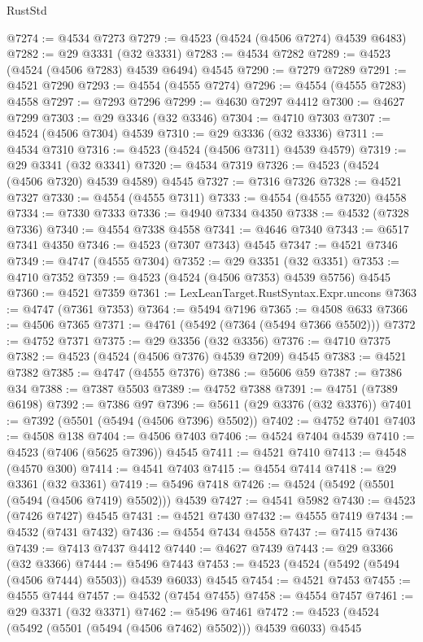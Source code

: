 \begin{lexlean}{RustStd}
\begin{coremodule}
@7274 := @4534 @7273
@7279 := @4523 (@4524 (@4506 @7274) @4539 @6483)
@7282 := @29 @3331 (@32 @3331)
@7283 := @4534 @7282
@7289 := @4523 (@4524 (@4506 @7283) @4539 @6494) @4545
@7290 := @7279 @7289
@7291 := @4521 @7290
@7293 := @4554 (@4555 @7274)
@7296 := @4554 (@4555 @7283) @4558
@7297 := @7293 @7296
@7299 := @4630 @7297 @4412
@7300 := @4627 @7299
@7303 := @29 @3346 (@32 @3346)
@7304 := @4710 @7303
@7307 := @4524 (@4506 @7304) @4539
@7310 := @29 @3336 (@32 @3336)
@7311 := @4534 @7310
@7316 := @4523 (@4524 (@4506 @7311) @4539 @4579)
@7319 := @29 @3341 (@32 @3341)
@7320 := @4534 @7319
@7326 := @4523 (@4524 (@4506 @7320) @4539 @4589) @4545
@7327 := @7316 @7326
@7328 := @4521 @7327
@7330 := @4554 (@4555 @7311)
@7333 := @4554 (@4555 @7320) @4558
@7334 := @7330 @7333
@7336 := @4940 @7334 @4350
@7338 := @4532 (@7328 @7336)
@7340 := @4554 @7338 @4558
@7341 := @4646 @7340
@7343 := @6517 @7341 @4350
@7346 := @4523 (@7307 @7343) @4545
@7347 := @4521 @7346
@7349 := @4747 (@4555 @7304)
@7352 := @29 @3351 (@32 @3351)
@7353 := @4710 @7352
@7359 := @4523 (@4524 (@4506 @7353) @4539 @5756) @4545
@7360 := @4521 @7359
@7361 := LexLeanTarget.RustSyntax.Expr.uncons
@7363 := @4747 (@7361 @7353)
@7364 := @5494 @7196
@7365 := @4508 @633
@7366 := @4506 @7365
@7371 := @4761 (@5492 (@7364 (@5494 @7366 @5502)))
@7372 := @4752 @7371
@7375 := @29 @3356 (@32 @3356)
@7376 := @4710 @7375
@7382 := @4523 (@4524 (@4506 @7376) @4539 @7209) @4545
@7383 := @4521 @7382
@7385 := @4747 (@4555 @7376)
@7386 := @5606 @59
@7387 := @7386 @34
@7388 := @7387 @5503
@7389 := @4752 @7388
@7391 := @4751 (@7389 @6198)
@7392 := @7386 @97
@7396 := @5611 (@29 @3376 (@32 @3376))
@7401 := @7392 (@5501 (@5494 (@4506 @7396) @5502))
@7402 := @4752 @7401
@7403 := @4508 @138
@7404 := @4506 @7403
@7406 := @4524 @7404 @4539
@7410 := @4523 (@7406 (@5625 @7396)) @4545
@7411 := @4521 @7410
@7413 := @4548 (@4570 @300)
@7414 := @4541 @7403
@7415 := @4554 @7414
@7418 := @29 @3361 (@32 @3361)
@7419 := @5496 @7418
@7426 := @4524 (@5492 (@5501 (@5494 (@4506 @7419) @5502))) @4539
@7427 := @4541 @5982
@7430 := @4523 (@7426 @7427) @4545
@7431 := @4521 @7430
@7432 := @4555 @7419
@7434 := @4532 (@7431 @7432)
@7436 := @4554 @7434 @4558
@7437 := @7415 @7436
@7439 := @7413 @7437 @4412
@7440 := @4627 @7439
@7443 := @29 @3366 (@32 @3366)
@7444 := @5496 @7443
@7453 := @4523 (@4524 (@5492 (@5494 (@4506 @7444) @5503)) @4539 @6033) @4545
@7454 := @4521 @7453
@7455 := @4555 @7444
@7457 := @4532 (@7454 @7455)
@7458 := @4554 @7457
@7461 := @29 @3371 (@32 @3371)
@7462 := @5496 @7461
@7472 := @4523 (@4524 (@5492 (@5501 (@5494 (@4506 @7462) @5502))) @4539 @6033) @4545

\end{coremodule}
\end{lexlean}

